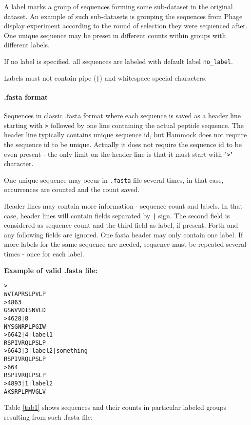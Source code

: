 \documentclass[11pt, a4paper, twoside, titlepage]{article}
\begin{document}
A label marks a group of sequences forming some sub-dataset in the original dataset. An example of such sub-datasets is grouping the sequences from Phage display experiment according to the round of selection they were sequenced after. One unique sequence may be preset in different counts within groups with different labels. 

If no label is specified, all sequences are labeled with default label \texttt{no\_label}.

Labels must not contain pipe (\texttt{|}) and whitespace special characters.

\paragraph{.fasta format}\label{fastaFormat}
Sequences in classic .fasta format where each sequence is saved as a header line starting with \texttt{>} followed by one line containing the actual peptide sequence. The header line typically contains unique sequence id, but Hammock does not require the sequence id to be unique. Actually it does not require the sequence id to be even present - the only limit on the header line is that it must start with "\texttt{>}" character.

One unique sequence may occur in \texttt{.fasta} file several times, in that case, occurrences are counted and the count saved. 

Header lines may contain more information - sequence count and labels. In that case, header lines will contain fields separated by \texttt{|} sign. The second field is considered as sequence count and the third field as label, if present. Forth and any following fields are ignored. One fasta header may only contain one label. If more labels for the same sequence are needed, sequence must be repeated several times - once for each label.  \newline 

\textbf{Example of valid .fasta file:} 

\begin{verbatim}
>
WVTAPRSLPVLP
>4863
GSWVVDISNVED
>4628|8
NYSGNRPLPGIW
>6642|4|label1
RSPIVRQLPSLP
>6643|3|label2|something
RSPIVRQLPSLP
>664
RSPIVRQLPSLP
>4893|1|label2
AKSRPLPMVGLV
\end{verbatim}

Table \ref{tab1} shows sequences and their counts in particular labeled groups resulting from such .fasta file: 
\end{document}
